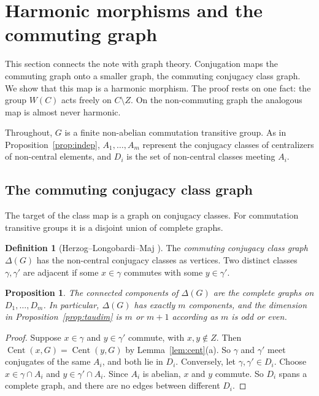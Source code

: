 \documentclass[12pt,letterpaper]{article}
\numberwithin{equation}{section}
\theoremstyle{plain}
\newtheorem{proposition}[theorem]{Proposition}
\theoremstyle{definition}
\newtheorem{definition}[theorem]{Definition}
\DeclareMathOperator{\Cent}{Cent}
\begin{document}
\section{Harmonic morphisms and the commuting graph}\label{sec:harmonic}

This section connects the note with graph theory. Conjugation maps the
commuting graph onto a smaller graph, the commuting conjugacy class graph.
We show that this map is a harmonic morphism. The proof rests on one fact:
the group $W(C)$ acts freely on $C\setminus Z$. On the non-commuting graph
the analogous map is almost never harmonic.

Throughout, $G$ is a finite non-abelian commutation transitive group. As in
Proposition~\ref{prop:indep}, $A_1,\dots,A_m$ represent the conjugacy
classes of centralizers of non-central elements, and $D_i$ is the set of
non-central classes meeting $A_i$.

\subsection{The commuting conjugacy class graph}

The target of the class map is a graph on conjugacy classes. For commutation
transitive groups it is a disjoint union of complete graphs.

\begin{definition}[Herzog--Longobardi--Maj \cite{HLM09}]\label{def:ccc}
The \emph{commuting conjugacy class graph} $\Delta(G)$ has the non-central
conjugacy classes as vertices. Two distinct classes $\gamma,\gamma'$ are
adjacent if some $x\in\gamma$ commutes with some $y\in\gamma'$.
\end{definition}

\begin{proposition}\label{prop:ccc}
The connected components of $\Delta(G)$ are the complete graphs on
$D_1,\dots,D_m$. In particular, $\Delta(G)$ has exactly $m$ components, and
the dimension in Proposition~\ref{prop:taudim} is $m$ or $m+1$ according as
$m$ is odd or even.
\end{proposition}

\begin{proof}
Suppose $x\in\gamma$ and $y\in\gamma'$ commute, with $x,y\notin Z$. Then
$\Cent(x,G)=\Cent(y,G)$ by Lemma~\ref{lem:cent}(a). So $\gamma$ and
$\gamma'$ meet conjugates of the same $A_i$, and both lie in $D_i$.
Conversely, let $\gamma,\gamma'\in D_i$. Choose $x\in\gamma\cap A_i$ and
$y\in\gamma'\cap A_i$. Since $A_i$ is abelian, $x$ and $y$ commute. So $D_i$
spans a complete graph, and there are no edges between different $D_i$.
\end{proof}
\end{document}

